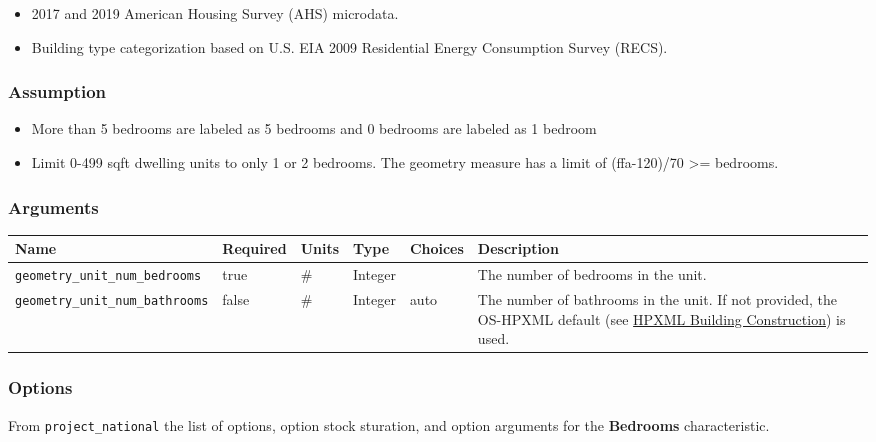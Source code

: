 \begin{itemize}
 
\item
  2017 and 2019 American Housing Survey (AHS) microdata.
\item
  Building type categorization based on U.S. EIA 2009 Residential Energy
  Consumption Survey (RECS).
\end{itemize}

\subsubsection{Assumption}\label{assumption-2}

\begin{itemize}
 
\item
  More than 5 bedrooms are labeled as 5 bedrooms and 0 bedrooms are
  labeled as 1 bedroom
\item
  Limit 0-499 sqft dwelling units to only 1 or 2 bedrooms. The geometry
  measure has a limit of (ffa-120)/70 \textgreater= bedrooms.
\end{itemize}

\subsubsection{Arguments}\label{arguments-3}

\begin{longtable}[]{@{}llllll@{}}
\toprule\noalign{}
Name & Required & Units & Type & Choices & Description \\
\midrule\noalign{}
\endhead
\bottomrule\noalign{}
\endlastfoot
\texttt{geometry\_unit\_num\_bedrooms} & true & \# & Integer & & The
number of bedrooms in the unit. \\
\texttt{geometry\_unit\_num\_bathrooms} & false & \# & Integer & auto &
The number of bathrooms in the unit. If not provided, the OS-HPXML
default (see
\href{https://openstudio-hpxml.readthedocs.io/en/v1.7.0/workflow_inputs.html\#hpxml-building-construction}{HPXML
Building Construction}) is used. \\
\end{longtable}

\subsubsection{Options}\label{options-7}

From \texttt{project\_national} the list of options, option stock
sturation, and option arguments for the \textbf{Bedrooms}
characteristic.

